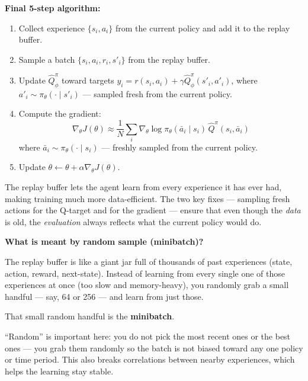 \medskip
\textbf{Final 5-step algorithm:}
\begin{enumerate}
    \item Collect experience $\{s_i, a_i\}$ from the current policy and add it
          to the replay buffer.
    \item Sample a batch $\{s_i, a_i, r_i, s'_i\}$ from the replay buffer.
    \item Update $\hat{Q}^{\pi}_\phi$ toward targets
          $y_i = r(s_i, a_i) + \gamma \hat{Q}^{\pi}_\phi(s'_i, a'_i)$,
          where $a'_i \sim \pi_\theta(\cdot \mid s'_i)$ --- sampled fresh from
          the current policy.
    \item Compute the gradient:
          \[
              \nabla_\theta J(\theta) \approx \frac{1}{N} \sum_i
              \nabla_\theta \log \pi_\theta(\bar{a}_i \mid s_i) \,
              \hat{Q}^{\pi}(s_i, \bar{a}_i)
          \]
          where $\bar{a}_i \sim \pi_\theta(\cdot \mid s_i)$ --- freshly sampled
          from the current policy.
    \item Update $\theta \leftarrow \theta + \alpha \nabla_\theta J(\theta)$.
\end{enumerate}

\medskip
The replay buffer lets the agent learn from every experience it has ever had,
making training much more data-efficient. The two key fixes --- sampling fresh
actions for the Q-target and for the gradient --- ensure that even though the
\textit{data} is old, the \textit{evaluation} always reflects what the current
policy would do.

\bigskip
\bigskip


\textbf{What is meant by random sample (minibatch)?}

\medskip
The replay buffer is like a giant jar full of thousands of past experiences
(state, action, reward, next-state). Instead of learning from every single one
of those experiences at once (too slow and memory-heavy), you randomly grab a
small handful --- say, 64 or 256 --- and learn from just those.

That small random handful is the \textbf{minibatch}.

``Random'' is important here: you do not pick the most recent ones or the best
ones --- you grab them randomly so the batch is not biased toward any one policy
or time period. This also breaks correlations between nearby experiences, which
helps the learning stay stable.

